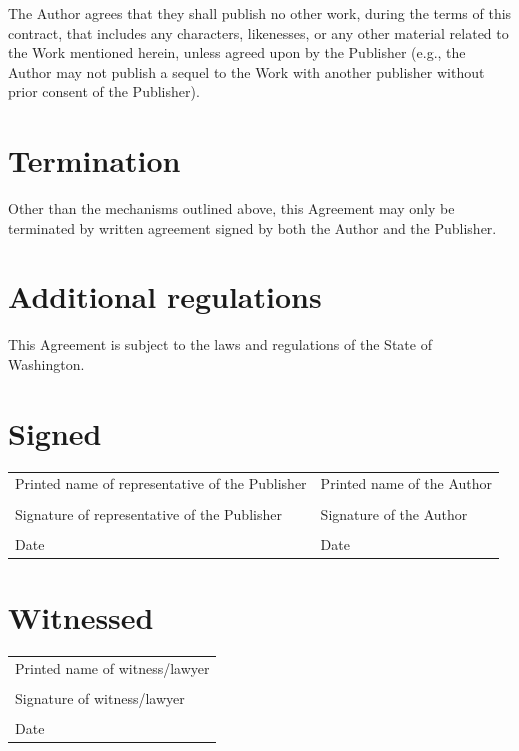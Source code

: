 \documentclass[12pt,letterpaper,oneside]{article}
\begin{document}
The Author agrees that they shall publish no other work, during the terms of this contract, that includes any characters, likenesses, or any other material related to the Work mentioned herein, unless agreed upon by the Publisher (e.g., the Author may not publish a sequel to the Work with another publisher without prior consent of the Publisher).

\section{Termination}

Other than the mechanisms outlined above, this Agreement may only be terminated by written agreement signed by both the Author and the Publisher.

\section{Additional regulations}

This Agreement is subject to the laws and regulations of the State of Washington.

\newpage

\thispagestyle{final}

\section*{Signed}

\begin{tabular}{p{3in} | p{3in}}
    \vspace{0.5in} & \\ \hline
    Printed name of representative of the Publisher & Printed name of the Author \\
    \vspace{0.5in} & \\ \hline
    Signature of representative of the Publisher & Signature of the Author \\
    \vspace{0.5in} & \\ \hline
    Date & Date \\
\end{tabular}

\section*{Witnessed}

\begin{tabular}{l}
    \vspace{0.5in} \\ \hline
    Printed name of witness/lawyer \\
    \vspace{0.5in} \\ \hline
    Signature of witness/lawyer \\
    \vspace{0.5in} \\ \hline
    Date \\
\end{tabular}
\end{document}
